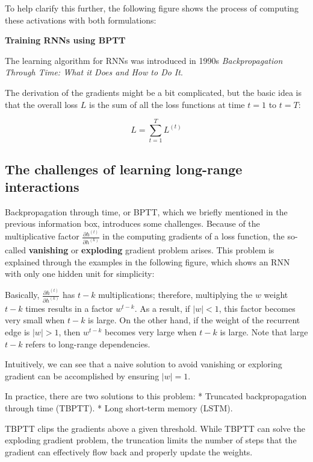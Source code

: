\documentclass[11pt]{article}
\begin{document}
To help clarify this further, the following figure shows the process of
computing these activations with both formulations:

    \textbf{Training RNNs using BPTT}

The learning algorithm for RNNs was introduced in 1990s
\emph{Backpropagation Through Time: What it Does and How to Do It}.

The derivation of the gradients might be a bit complicated, but the
basic idea is that the overall loss \(L\) is the sum of all the loss
functions at time \(t=1\) to \(t=T\):

\[L = \sum_{t=1}^T L^{(t)}\]

    \subsection{The challenges of learning long-range
interactions}\label{the-challenges-of-learning-long-range-interactions}

    Backpropagation through time, or BPTT, which we briefly mentioned in the
previous information box, introduces some challenges. Because of the
multiplicative factor \(\frac{\partial h^{(t)}}{\partial h^{(k)}}\) in
the computing gradients of a loss function, the so-called
\textbf{vanishing} or \textbf{exploding} gradient problem arises. This
problem is explained through the examples in the following figure, which
shows an RNN with only one hidden unit for simplicity:

    Basically, \(\frac{\partial h^{(t)}}{\partial h^{(k)}}\) has \(t-k\)
multiplications; therefore, multiplying the \(w\) weight \(t-k\) times
results in a factor \(w^{t-k}\). As a result, if \(|w| < 1\), this
factor becomes very small when \(t-k\) is large. On the other hand, if
the weight of the recurrent edge is \(|w| > 1\), then \(w^{t-k}\)
becomes very large when \(t-k\) is large. Note that large \(t-k\) refers
to long-range dependencies.

Intuitively, we can see that a naive solution to avoid vanishing or
exploring gradient can be accomplished by ensuring \(|w| = 1\).

In practice, there are two solutions to this problem: * Truncated
backpropagation through time (TBPTT). * Long short-term memory (LSTM).

TBPTT clips the gradients above a given threshold. While TBPTT can solve
the exploding gradient problem, the truncation limits the number of
steps that the gradient can effectively flow back and properly update
the weights.
\end{document}
